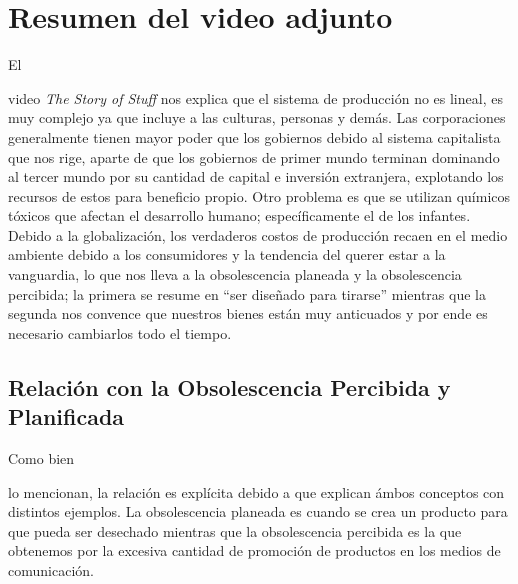 \documentclass[stu, 12pt, letterpaper, donotrepeattitle, floatsintext, natbib]{apa7}
\begin{document}
\section{Resumen del video adjunto}
El \begin{justifying}
  video \emph{The Story of Stuff} nos explica que el sistema de producción no es lineal, es muy complejo ya que incluye a las culturas, personas y demás.
  Las corporaciones generalmente tienen mayor poder que los gobiernos debido al sistema capitalista que nos rige, aparte de que los gobiernos de primer mundo terminan
  dominando al tercer mundo por su cantidad de capital e inversión extranjera, explotando los recursos de estos para beneficio propio. Otro problema es que se utilizan químicos
  tóxicos que afectan el desarrollo humano; específicamente el de los infantes. Debido a la globalización, los verdaderos costos de producción recaen en el medio ambiente
  debido a los consumidores y la tendencia del querer estar a la vanguardia, lo que nos lleva a la obsolescencia planeada y la obsolescencia percibida; la primera se resume
  en ``ser diseñado para tirarse'' mientras que la segunda nos convence que nuestros bienes están muy anticuados y por ende es necesario cambiarlos todo el tiempo. \citep{unknown-author-2009}\par
\end{justifying}
\vspace{\baselineskip}
\subsection{Relación con la Obsolescencia Percibida y Planificada}
Como bien \begin{justifying}
  lo mencionan, la relación es explícita debido a que explican ámbos conceptos con distintos ejemplos. La obsolescencia planeada es cuando se crea un producto para que
  pueda ser desechado mientras que la obsolescencia percibida es la que obtenemos por la excesiva cantidad de promoción de productos en los medios de comunicación.\par
\end{justifying}
\newpage
\setcounter{secnumdepth}{0} %
\renewcommand\refname{\textbf{Referencias}}
\end{document}
